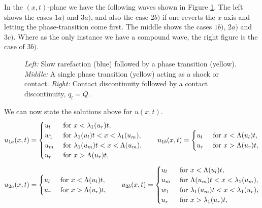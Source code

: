 \documentclass[10pt]{article}
\numberwithin{equation}{section}
\begin{document}
In the $(x,t)$-plane we have the following waves shown in Figure \ref{fig:PhTSolInXT}. The left shows the cases $1a)$ and $3a)$, and also the case $2b)$ if one reverts the $x$-axis and letting the phase-transition come first. The middle shows the cases $1b)$, $2a)$ and $ 3c)$. Where as the only instance we have a compound wave, the right figure is the case of $3b)$. 
\begin{figure}
    \centering
    
    \caption{\textit{Left:} Slow rarefaction (blue) followed by a phase transition (yellow). \textit{Middle:} A single phase transition (yellow) acting as a shock or contact. \textit{Right:} Contact discontinuity followed by a contact discontinuity, $q_l = Q$.}
    \label{fig:PhTSolInXT}
\end{figure}

We can now state the solutions above for $u(x,t)$.
\begin{align}
    u_{1a}(x,t) = \begin{cases}
        u_l & \text{ for $ x < \lambda_1(u_r)t$}, \\
         w_1 &\text{ for $  \lambda_1(u_l)t < x < \lambda_1(u_m)$}, \\
        u_m & \text{ for $  \lambda_1(u_m)t < x < \Lambda(u_m)$}, \\
        u_r & \text{ for $x > \Lambda(u_r)t$},
    \end{cases} 
    \quad \quad 
    u_{1b}(x,t) = \begin{cases}
        u_l & \text{ for $ x < \Lambda(u_l)t$}, \\
        u_r & \text{ for $x > \Lambda( u_r)t$},
    \end{cases} 
    \label{Eq:Sol1}
\end{align}
\begin{align}
    u_{2a}(x,t) = \begin{cases}
        u_l & \text{ for $ x < \Lambda(u_l)t$}, \\
        u_r & \text{ for $x > \Lambda( u_r)t$},
    \end{cases} 
    \quad \quad 
    u_{2b}(x,t) = \begin{cases}
        u_l & \text{ for $ x < \Lambda(u_l)t$}, \\
        u_m & \text{ for $  \Lambda(u_m)t < x < \lambda_1(u_m)$}, \\
        w_1 &\text{ for $  \lambda_1(u_m)t < x < \lambda_1(u_r)$}, \\
        u_r & \text{ for $x > \lambda_1( u_r)t$},
    \end{cases} 
    \label{Eq:Sol2}
\end{align}
\end{document}
